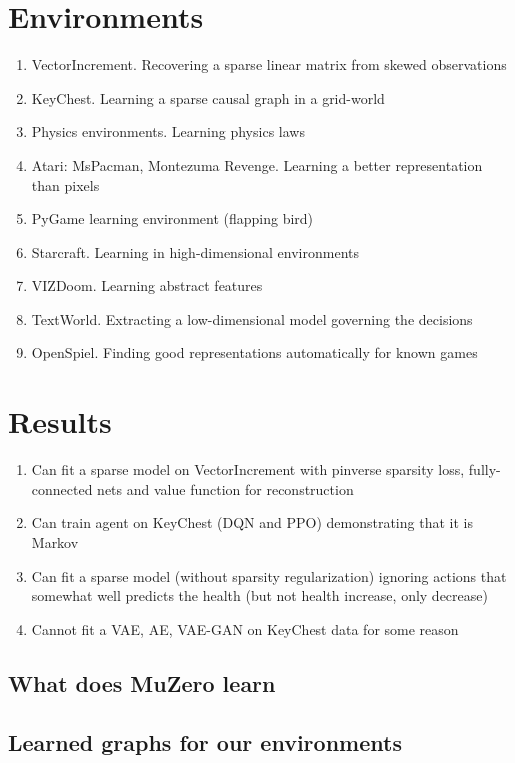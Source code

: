 \documentclass[a4paper,11pt,oneside]{report}
\begin{document}
\section{Environments}
\begin{enumerate}
    \item VectorIncrement. Recovering a sparse linear matrix from skewed observations
    \item KeyChest. Learning a sparse causal graph in a grid-world
    \item Physics environments. Learning physics laws
    \item Atari: MsPacman, Montezuma Revenge. Learning a better representation than pixels
    \item PyGame learning environment (flapping bird)
    \item Starcraft. Learning in high-dimensional environments
    \item VIZDoom. Learning abstract features
    \item TextWorld. Extracting a low-dimensional model governing the decisions
    \item OpenSpiel. Finding good representations automatically for known games
\end{enumerate}

\section{Results}

\begin{enumerate}
    \item Can fit a sparse model on VectorIncrement with pinverse sparsity loss, fully-connected nets and value function for reconstruction
    \item Can train agent on KeyChest (DQN and PPO) demonstrating that it is Markov
    \item Can fit a sparse model (without sparsity regularization) ignoring actions that somewhat well predicts the health (but not health increase, only decrease)
    \item Cannot fit a VAE, AE, VAE-GAN on KeyChest data for some reason
\end{enumerate}

\subsection{What does MuZero learn}
\subsection{Learned graphs for our environments}
\end{document}
